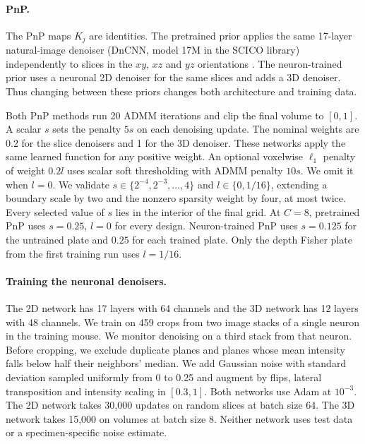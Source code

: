 \paragraph{PnP.}
The PnP maps $K_j$ are identities. The pretrained prior applies the same 17-layer natural-image denoiser (DnCNN, model 17M in the SCICO library) independently to slices in the $xy$, $xz$ and $yz$ orientations \cite{zhang2017,balke2022scico}. The neuron-trained prior uses a neuronal 2D denoiser for the same slices and adds a 3D denoiser. Thus changing between these priors changes both architecture and training data.

Both PnP methods run 20 ADMM iterations and clip the final volume to $[0,1]$. A scalar $s$ sets the penalty $5s$ on each denoising update. The nominal weights are 0.2 for the slice denoisers and 1 for the 3D denoiser. These networks apply the same learned function for any positive weight. An optional voxelwise $\ell_1$ penalty of weight $0.2l$ uses scalar soft thresholding with ADMM penalty $10s$. We omit it when $l=0$. We validate $s\in\{2^{-4},2^{-3},\ldots,4\}$ and $l\in\{0,1/16\}$, extending a boundary scale by two and the nonzero sparsity weight by four, at most twice. Every selected value of $s$ lies in the interior of the final grid. At $C=8$, pretrained PnP uses $s=0.25$, $l=0$ for every design. Neuron-trained PnP uses $s=0.125$ for the untrained plate and $0.25$ for each trained plate. Only the depth Fisher plate from the first training run uses $l=1/16$.

\paragraph{Training the neuronal denoisers.}
The 2D network has 17 layers with 64 channels and the 3D network has 12 layers with 48 channels. We train on 459 crops from two image stacks of a single neuron in the training mouse. We monitor denoising on a third stack from that neuron. Before cropping, we exclude duplicate planes and planes whose mean intensity falls below half their neighbors' median. We add Gaussian noise with standard deviation sampled uniformly from 0 to 0.25 and augment by flips, lateral transposition and intensity scaling in $[0.3,1]$. Both networks use Adam at $10^{-3}$. The 2D network takes 30,000 updates on random slices at batch size 64. The 3D network takes 15,000 on volumes at batch size 8. Neither network uses test data or a specimen-specific noise estimate.
